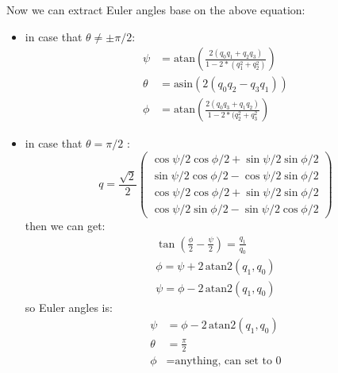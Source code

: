 \documentclass{article}
\begin{document}
Now we can extract Euler angles base on the above equation:
\begin{itemize}
\item in case that $\theta \ne \pm \pi/2$: 
\begin{equation}%
\begin{aligned}%
  \psi   &= \text{atan}\left(\frac{2(q_0q_1+q_2q_3)}{1-2*(q_1^2+q_2^2)}\right) \\
  \theta &= \text{asin}\left(2(q_0q_2-q_3q_1) \right)                   \\
  \phi   &= \text{atan}\left(\frac{2(q_0q_3+q_1q_2)}{1-2*(q_2^2+q_3^2}\right)
\end{aligned}%
\end{equation}

\item in case that $\theta = \pi/2$ :
\begin{equation}
q = \frac{\sqrt{2}}{2}\begin{pmatrix}%
\cos{\psi/2}\cos{\phi/2}+\sin{\psi/2}\sin{\phi/2} \\
\sin{\psi/2}\cos{\phi/2}-\cos{\psi/2}\sin{\phi/2} \\
\cos{\psi/2}\cos{\phi/2}+\sin{\psi/2}\sin{\phi/2} \\
\cos{\psi/2}\sin{\phi/2}-\sin{\psi/2}\cos{\phi/2}
\end{pmatrix}
\end{equation}
then we can get:
\begin{displaymath}
\begin{aligned}
  \tan{\left(\frac{\phi}{2}-\frac{\psi}{2}\right)} = \frac{q_1}{q_0} \\
\phi = \psi + 2\, \text{atan2}(q_1, q_0) \\
\psi = \phi - 2\, \text{atan2}(q_1, q_0)
\end{aligned}
\end{displaymath}
so Euler angles is:
\begin{equation}%
\begin{aligned}%
\psi &= \phi - 2\, \text{atan2}(q_1, q_0) \\
\theta &= \frac{\pi}{2} \\
\phi &= \text{anything, can set to 0}
\end{aligned}%
\end{equation}


\end{itemize}
\end{document}
